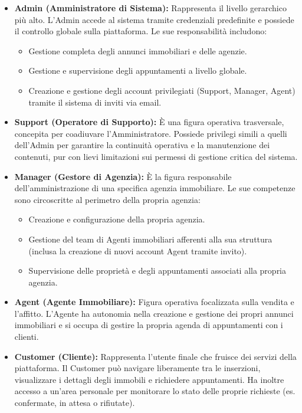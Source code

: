 \begin{itemize}
    \item \textbf{Admin (Amministratore di Sistema):} Rappresenta il livello gerarchico più alto. 
    L'Admin accede al sistema tramite credenziali predefinite e possiede il controllo globale sulla 
    piattaforma. Le sue responsabilità includono:
    \begin{itemize}
        \item Gestione completa degli annunci immobiliari e delle agenzie.
        \item Gestione e supervisione degli appuntamenti a livello globale.
        \item Creazione e gestione degli account privilegiati (Support, Manager, Agent) tramite il 
        sistema di inviti via email.
    \end{itemize}

    \item \textbf{Support (Operatore di Supporto):} È una figura operativa trasversale, concepita per 
    coadiuvare l'Amministratore. Possiede privilegi simili a quelli dell'Admin per garantire la continuità 
    operativa e la manutenzione dei contenuti, pur con lievi limitazioni sui permessi di gestione critica 
    del sistema.

    \item \textbf{Manager (Gestore di Agenzia):} È la figura responsabile dell'amministrazione di una 
    specifica agenzia immobiliare. Le sue competenze sono circoscritte al perimetro della propria agenzia:
    \begin{itemize}
        \item Creazione e configurazione della propria agenzia.
        \item Gestione del team di Agenti immobiliari afferenti alla sua struttura (inclusa la creazione 
        di nuovi account Agent tramite invito).
        \item Supervisione delle proprietà e degli appuntamenti associati alla propria agenzia.
    \end{itemize}

    \item \textbf{Agent (Agente Immobiliare):} Figura operativa focalizzata sulla vendita e l'affitto. 
    L'Agente ha autonomia nella creazione e gestione dei propri annunci immobiliari e si occupa di gestire 
    la propria agenda di appuntamenti con i clienti.

    \item \textbf{Customer (Cliente):} Rappresenta l'utente finale che fruisce dei servizi della piattaforma. 
    Il Customer può navigare liberamente tra le inserzioni, visualizzare i dettagli degli immobili e 
    richiedere appuntamenti. Ha inoltre accesso a un'area personale per monitorare lo stato delle proprie 
    richieste (es. confermate, in attesa o rifiutate).
\end{itemize}

